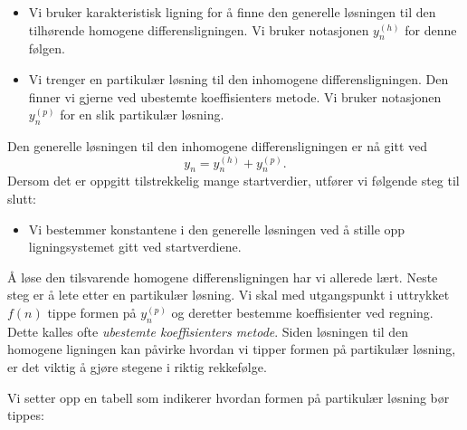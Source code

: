 \documentclass[11pt]{article}
\theoremstyle{definition}
\theoremstyle{definition}
\theoremstyle{definition}
\theoremstyle{definition}
\theoremstyle{definition}
\theoremstyle{definition}
\begin{document}
		\begin{itemize}
			\item Vi bruker karakteristisk ligning for å finne den generelle løsningen til den tilhørende homogene differensligningen. Vi bruker notasjonen \(y_n^{(h)} \) for denne følgen.
			\item Vi trenger en partikulær løsning til den inhomogene differensligningen. Den finner vi gjerne ved ubestemte koeffisienters metode. Vi bruker notasjonen \(y_n^{(p)} \) for en slik partikulær løsning. 
		\end{itemize}
		Den generelle løsningen til den inhomogene differensligningen er nå gitt ved \[y_n=y_n^{(h)}+y_n^{(p)}. \]
		Dersom det er oppgitt tilstrekkelig mange startverdier, utfører vi følgende steg til slutt:
		
		\begin{itemize}
			\item Vi bestemmer konstantene i den generelle løsningen ved å stille opp ligningsystemet gitt ved startverdiene.
		\end{itemize}
		
		Å løse den tilsvarende homogene differensligningen har vi allerede lært. Neste steg er å lete etter en partikulær løsning. Vi skal med utgangspunkt i uttrykket \(f(n)\) tippe formen på \(y_n^{(p)}\) og deretter bestemme koeffisienter ved regning. Dette kalles ofte \textit{ubestemte koeffisienters metode}. Siden løsningen til den homogene ligningen kan påvirke hvordan vi tipper formen på partikulær løsning, er det viktig å gjøre stegene i riktig rekkefølge. 
		
		Vi setter opp en tabell som indikerer hvordan formen på partikulær løsning bør tippes:
		
\end{document}
